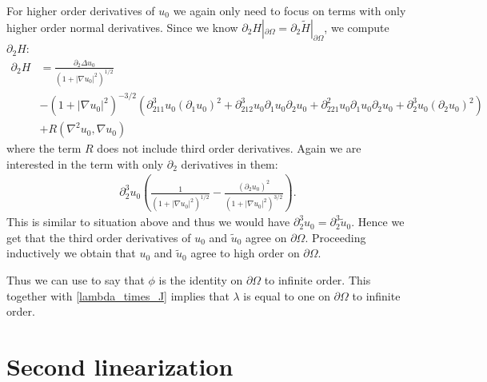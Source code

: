 \documentclass[a4paper, 10pt, twoside, notitlepage]{amsart}
\theoremstyle{plain}
\newcommand{\Om}{\Omega}
\numberwithin{equation}{section}
\newcommand {\p} {\partial}
\newcommand{\abs}[1]{\lvert #1 \rvert}
\newcommand{\janne}[1]{\begin{quotation}[\textbf{\color{purple}Janne's comment:\
		}{\color{purple}\textit{#1}}]\end{quotation}}
\begin{document}
For higher order derivatives of $u_0$ we again only need to focus on terms with only higher order normal derivatives. Since we know $\p_2H|_{\p\Om}=\p_2\tilde H|_{\p\Om}$, we compute $\p_2 H$:
\begin{align*}
	\p_2H &= \frac{\p_2\Delta u_0}{(1+\abs{\nabla u_0}^2)^{1/2}} \\
	&- (1+\abs{\nabla u_0}^2)^{-3/2}\left(\p^3_{211}u_0(\p_1 u_0)^2 + \p^3_{212}u_0\p_1u_0\p_2u_0 + \p^2_{221}u_0\p_1u_0\p_2u_0 + \p^3_2u_0(\p_2u_0)^2\right)\\
	&+ R(\nabla^2u_0,\nabla u_0)
\end{align*}
where the term $R$ does not include third order derivatives. Again we are interested in the term with only $\p_2$ derivatives in them:
\begin{align*}
	\p^3_2u_0\left(\frac{1}{(1+\abs{\nabla u_0}^2)^{1/2}} - \frac{(\p_2u_0)^2}{(1+\abs{\nabla u_0}^2)^{3/2}}\right).
\end{align*}
This is similar to situation above and thus we would have $\p^3_2u_0 = \p^3_2\tilde u_0$.
Hence we get that the third order derivatives of $u_0$ and $\tilde u_0$ agree on $\p\Om$. Proceeding inductively we obtain that $u_0$ and $\tilde u_0$ agree to high order on $\p\Om$.

Thus we can use \cite[Lemma 5.1]{carstea2023inverseproblemgeneralminimal} to say that $\phi$ is the identity on $\p\Om$ to infinite order. This together with \eqref{lambda_times_J} implies that $\lambda$ is equal to one on $\p\Om$ to infinite order.



\section{Second linearization}\label{sec_second_lin}
\end{document}
